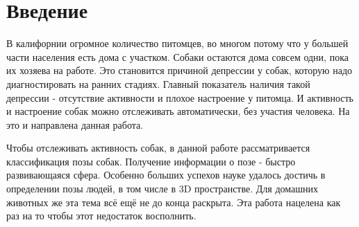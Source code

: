 \chapter*{Введение}							%

В калифорнии огромное количество питомцев, во многом потому что у большей части населения есть дома с участком. Собаки остаются дома совсем одни, пока их хозяева на работе. Это становится причиной депрессии у собак, которую надо диагностировать на ранних стадиях. Главный показатель наличия такой депрессии - отсутствие активности и плохое настроение у питомца. И активность и настроение собак можно отслеживать автоматически, без участия человека. На это и направлена данная работа.

Чтобы отслеживать активность собак, в данной работе рассматривается классификация позы собак. Получение информации о позе - быстро развивающаяся сфера. Особенно больших успехов науке удалось достичь в определении позы людей, в том числе в 3D пространстве. Для домашних животных же эта тема всё ещё не до конца раскрыта. Эта работа нацелена как раз на то чтобы этот недостаток восполнить.